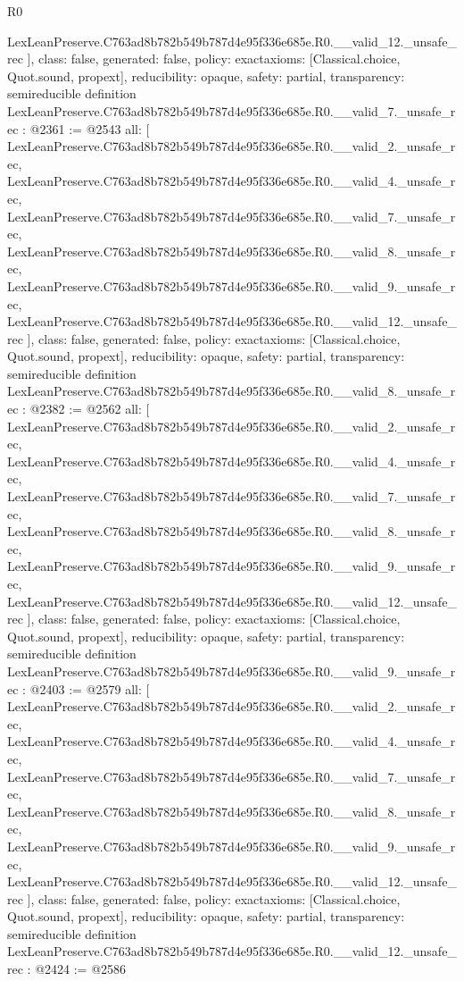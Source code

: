 \begin{lexlean}{R0}
\begin{coremodule}
{    LexLeanPreserve.C763ad8b782b549b787d4e95f336e685e.R0.__valid_12._unsafe_rec
  ],
  class: false,
  generated: false,
  policy: exact{axioms: [Classical.choice, Quot.sound, propext]},
  reducibility: opaque{},
  safety: partial,
  transparency: semireducible
}
definition LexLeanPreserve.C763ad8b782b549b787d4e95f336e685e.R0.__valid_7._unsafe_rec : @2361 := @2543 {
  all: [
    LexLeanPreserve.C763ad8b782b549b787d4e95f336e685e.R0.__valid_2._unsafe_rec,
    LexLeanPreserve.C763ad8b782b549b787d4e95f336e685e.R0.__valid_4._unsafe_rec,
    LexLeanPreserve.C763ad8b782b549b787d4e95f336e685e.R0.__valid_7._unsafe_rec,
    LexLeanPreserve.C763ad8b782b549b787d4e95f336e685e.R0.__valid_8._unsafe_rec,
    LexLeanPreserve.C763ad8b782b549b787d4e95f336e685e.R0.__valid_9._unsafe_rec,
    LexLeanPreserve.C763ad8b782b549b787d4e95f336e685e.R0.__valid_12._unsafe_rec
  ],
  class: false,
  generated: false,
  policy: exact{axioms: [Classical.choice, Quot.sound, propext]},
  reducibility: opaque{},
  safety: partial,
  transparency: semireducible
}
definition LexLeanPreserve.C763ad8b782b549b787d4e95f336e685e.R0.__valid_8._unsafe_rec : @2382 := @2562 {
  all: [
    LexLeanPreserve.C763ad8b782b549b787d4e95f336e685e.R0.__valid_2._unsafe_rec,
    LexLeanPreserve.C763ad8b782b549b787d4e95f336e685e.R0.__valid_4._unsafe_rec,
    LexLeanPreserve.C763ad8b782b549b787d4e95f336e685e.R0.__valid_7._unsafe_rec,
    LexLeanPreserve.C763ad8b782b549b787d4e95f336e685e.R0.__valid_8._unsafe_rec,
    LexLeanPreserve.C763ad8b782b549b787d4e95f336e685e.R0.__valid_9._unsafe_rec,
    LexLeanPreserve.C763ad8b782b549b787d4e95f336e685e.R0.__valid_12._unsafe_rec
  ],
  class: false,
  generated: false,
  policy: exact{axioms: [Classical.choice, Quot.sound, propext]},
  reducibility: opaque{},
  safety: partial,
  transparency: semireducible
}
definition LexLeanPreserve.C763ad8b782b549b787d4e95f336e685e.R0.__valid_9._unsafe_rec : @2403 := @2579 {
  all: [
    LexLeanPreserve.C763ad8b782b549b787d4e95f336e685e.R0.__valid_2._unsafe_rec,
    LexLeanPreserve.C763ad8b782b549b787d4e95f336e685e.R0.__valid_4._unsafe_rec,
    LexLeanPreserve.C763ad8b782b549b787d4e95f336e685e.R0.__valid_7._unsafe_rec,
    LexLeanPreserve.C763ad8b782b549b787d4e95f336e685e.R0.__valid_8._unsafe_rec,
    LexLeanPreserve.C763ad8b782b549b787d4e95f336e685e.R0.__valid_9._unsafe_rec,
    LexLeanPreserve.C763ad8b782b549b787d4e95f336e685e.R0.__valid_12._unsafe_rec
  ],
  class: false,
  generated: false,
  policy: exact{axioms: [Classical.choice, Quot.sound, propext]},
  reducibility: opaque{},
  safety: partial,
  transparency: semireducible
}
definition LexLeanPreserve.C763ad8b782b549b787d4e95f336e685e.R0.__valid_12._unsafe_rec : @2424 := @2586 {
}
\end{coremodule}
\end{lexlean}
